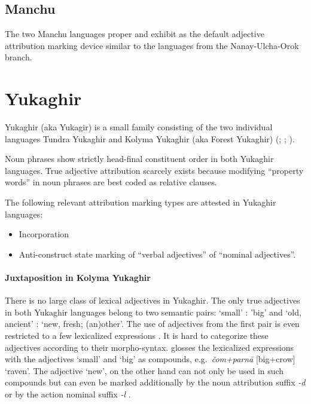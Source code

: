 \subsection{Manchu}
The two Manchu languages  proper and  exhibit  as the default adjective attribution marking device similar to the languages from the Nanay-Ulcha-Orok branch.

\section{Yukaghir}\label{yukagir synchr}
Yukaghir (aka Yukagir) is a small family consisting of the two individual languages Tundra Yukaghir and Kolyma Yukaghir (aka Forest Yukaghir) (\citealt[223]{salminen2007}; \citealt[1–2]{maslova2003a}; \citealt[1]{maslova2003b}).

Noun phrases show strictly head-final constituent order in both Yukaghir languages. True adjective attribution scarcely exists because modifying “property words” in noun phrases are best coded as relative clauses.

The following relevant attribution marking types are attested in Yukaghir languages:
\begin{itemize}
\item Incorporation
\item Anti\hyp{}construct state marking
	\subitem of “verbal adjectives”
	\subitem of “nominal adjectives”.
\end{itemize}

\paragraph*{Juxtaposition in Kolyma Yukaghir}
There is no large class of lexical adjectives in Yukaghir. The only true adjectives in both Yukaghir languages belong to two semantic pairs: ‘small’ : ’big’ and ‘old, ancient’ : ‘new, fresh; (an)other’. The use of adjectives from the first pair is even restricted to a few lexicalized expressions \cite[70–71]{maslova2003b}. It is hard to categorize these adjectives according to their morpho-syntax. \citet[71]{maslova2003b} glosses the lexicalized expressions with the adjectives ‘small’ and ‘big’ as compounds, e.g.~\textit{čom+parnā} [big+crow] ‘raven’. The adjective ‘new’, on the other hand can not only be used in such compounds but can even be marked additionally by the noun attribution suffix \textit{-d} or by the action nominal suffix \textit{-l} \cite[71]{maslova2003b}.

